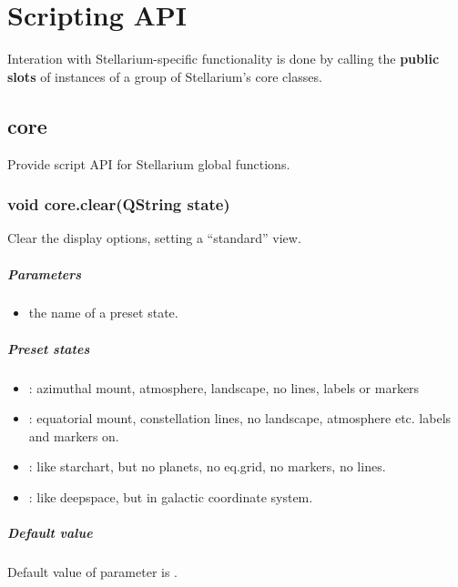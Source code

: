 \chapter{Scripting API}
\label{ch:ScriptingAPI}

Interation with Stellarium-specific functionality is done by calling the \textbf{public slots} of instances of a group of Stellarium's core classes.

\section{core}
\label{sec:ScriptingAPI:core}
Provide script API for Stellarium global functions.

\subsection{void core.clear(QString state)}
\label{sec:ScriptingAPI:core:clear}
Clear the display options, setting a ``standard'' view.

\paragraph{Parameters}
\begin{itemize}
\item {} the name of a preset state.
\end{itemize}

\paragraph{Preset states}
\begin{itemize}
\item {}: azimuthal mount, atmosphere, landscape, no lines, labels or markers
\item {}: equatorial mount, constellation lines, no landscape, atmosphere etc. labels and markers on.
\item {}: like starchart, but no planets, no eq.grid, no markers, no lines.
\item {}: like deepspace, but in galactic coordinate system.
\end{itemize}

\paragraph{Default value}
Default value of parameter is .

